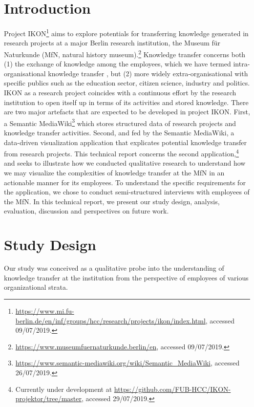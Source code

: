 \documentclass{article}
\begin{document}
\section{Introduction}
Project IKON\footnote{\url{https://www.mi.fu-berlin.de/en/inf/groups/hcc/research/projects/ikon/index.html}, accessed 09/07/2019.} aims to explore potentials for transferring knowledge generated in research projects at a major Berlin research institution, the Museum f\"ur Naturkunde (MfN, natural history museum).\footnote{\url{https://www.museumfuernaturkunde.berlin/en}, accessed 09/07/2019.} Knowledge transfer concerns both (1) the exchange of knowledge among the employees, which we have termed intra-organisational knowledge transfer \cite{oppenlaender_towards_2018}, but (2) more widely extra-organisational with specific publics such as the education sector, citizen science, industry and politics. IKON as a research project coincides with a continuous effort by the research institution to open itself up in terms of its activities and stored knowledge. There are two major artefacts that are expected to be developed in project IKON. First, a Semantic MediaWiki\footnote{\url{https://www.semantic-mediawiki.org/wiki/Semantic_MediaWiki}, accessed 26/07/2019.} which stores structured data of research projects and knowledge transfer activities. Second, and fed by the Semantic MediaWiki, a data-driven visualization application that explicates potential knowledge transfer from research projects. This technical report concerns the second application,\footnote{Currently under development at \url{https://github.com/FUB-HCC/IKON-projektor/tree/master}, accessed 29/07/2019.} and seeks to illustrate how we conducted qualitative research to understand how we may visualize the complexities of knowledge transfer at the MfN in an actionable manner for its employees. To understand the specific requirements for the application, we chose to conduct semi-structured interviews with employees of the MfN. In this technical report, we present our study design, analysis, evaluation, discussion and perspectives on future work. 

\section{Study Design}
Our study was conceived as a qualitative probe into the understanding of knowledge transfer at the institution from the perspective of employees of various organizational strata.
\end{document}

